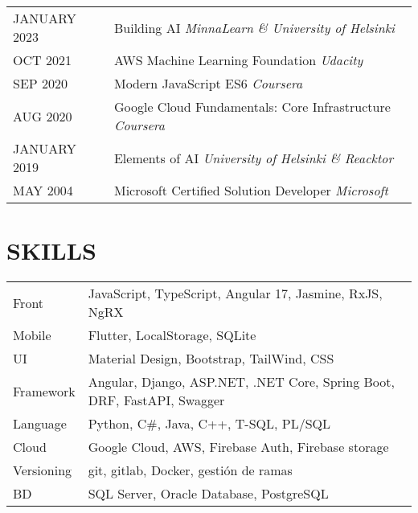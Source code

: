 \documentclass[a4paper,12pt]{article}
\begin{document}
\begin{tabularx}{\linewidth}{@{}l X@{}}	
JANUARY 2023 & Building AI \hfill \textsl{MinnaLearn \& University of Helsinki} \\

OCT 2021 & AWS Machine Learning Foundation \hfill \textsl{Udacity} \\

SEP 2020 & Modern JavaScript ES6 \hfill \textsl{Coursera} \\

AUG 2020 & Google Cloud Fundamentals: Core Infrastructure \hfill \textsl{Coursera} \\

JANUARY 2019 & Elements of AI \hfill \textsl{University of Helsinki \& Reacktor} \\

MAY 2004 & Microsoft Certified Solution Developer \hfill \textsl{Microsoft} \\

\end{tabularx}

\section{SKILLS}
\begin{tabularx}{\linewidth}{@{}l X@{}}
Front &  \normalsize{JavaScript, TypeScript, Angular 17, Jasmine, RxJS, NgRX}\\
Mobile & \normalsize{Flutter, LocalStorage, SQLite } \\
UI  &  \normalsize{Material Design, Bootstrap, TailWind, CSS}\\  
Framework  &  \normalsize{Angular, Django, ASP.NET, .NET Core, Spring Boot, DRF, FastAPI, Swagger}\\
Language  &  \normalsize{Python, C\#, Java, C++, T-SQL, PL/SQL }\\
Cloud  &  \normalsize{Google Cloud, AWS, Firebase Auth, Firebase storage}\\
Versioning  &  \normalsize{git, gitlab, Docker, gestión de ramas}\\
BD  &  \normalsize{SQL Server, Oracle Database, PostgreSQL }\\
\end{tabularx}



\vfill
{}
\end{document}
